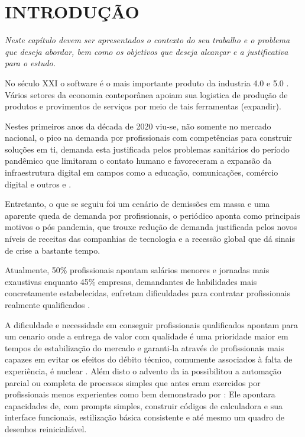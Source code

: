 


\section{\textbf{INTRODUÇÃO}}
    \label{sec:introdução}
    \textit{Neste capítulo devem ser apresentados o contexto do seu trabalho e o problema que
    deseja abordar, bem como os objetivos que deseja alcançar e a justificativa para o estudo.}
    
    No século XXI o software é o mais importante produto da industria 4.0 e 5.0 .
    Vários setores da economia conteporânea apoiam sua logistica de produção de produtos e 
    provimentos de serviços por meio de tais ferramentas (expandir).

    Nestes primeiros anos da década de 2020 viu-se, não somente no
    mercado nacional, o pico na demanda por profissionais com
    competências para construir soluções em \ac{ti}, demanda esta justificada pelos
    problemas sanitários do período pandêmico que limitaram o contato humano e favoreceram a expansão
    da infraestrutura digital em campos como a educação, comunicações,
    comércio digital e outros \cite{vieira2024impactos} e \cite{carreira2023}.
    
    Entretanto, o que se seguiu foi um cenário de demissões em massa e uma aparente
    queda de demanda por profissionais, o periódico   aponta
    como principais motivos o pós pandemia, que trouxe redução de demanda justificada
    pelos novos níveis de receitas das companhias de tecnologia e a recessão global
    que dá sinais de crise a bastante tempo.

    Atualmente, 50\% profissionais apontam salários menores e
    jornadas mais exaustivas enquanto 45\% empresas, demandantes de habilidades mais
    concretamente estabelecidas, enfretam dificuldades para contratar profissionais
    realmente qualificados \cite{cnn2024}.

    A dificuldade e necessidade em conseguir profissionais qualificados apontam para
    um cenario onde a entrega de valor com qualidade é uma prioridade maior em tempos de
    estabilização do mercado e garanti-la através de profissionais mais capazes
    em evitar os efeitos do débito técnico, comumente associados à falta de experiência,
    é nuclear \cite[p.~131 et all.]{beltrao2020}. Além disto o advento da \ac{ia} possibilitou
    a automação parcial ou completa de processos simples que antes eram exercidos por
    profissionais menos experientes como bem demonstrado por : Ele
    apontara capacidades de, com prompts simples, construir códigos de calculadora
    e sua interface funcionais, estilização básica consistente e até mesmo um quadro de desenhos
    reinicialiável.

